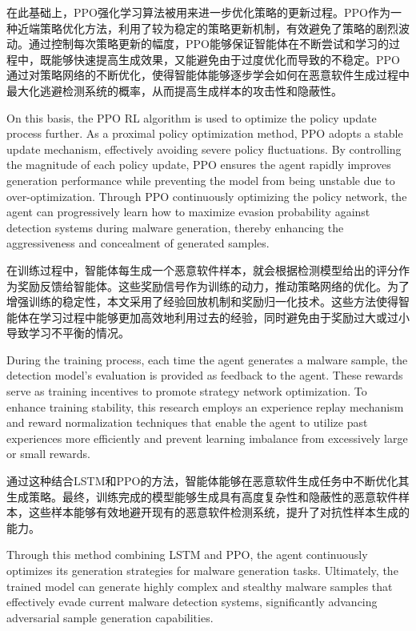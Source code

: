 在此基础上，PPO强化学习算法被用来进一步优化策略的更新过程。PPO作为一种近端策略优化方法，利用了较为稳定的策略更新机制，有效避免了策略的剧烈波动。通过控制每次策略更新的幅度，PPO能够保证智能体在不断尝试和学习的过程中，既能够快速提高生成效果，又能避免由于过度优化而导致的不稳定。PPO通过对策略网络的不断优化，使得智能体能够逐步学会如何在恶意软件生成过程中最大化逃避检测系统的概率，从而提高生成样本的攻击性和隐蔽性。

On this basis, the PPO RL algorithm is used to optimize the policy update process further. As a proximal policy optimization method, PPO adopts a stable update mechanism, effectively avoiding severe policy fluctuations. By controlling the magnitude of each policy update, PPO ensures the agent rapidly improves generation performance while preventing the model from being unstable due to over-optimization. Through PPO continuously optimizing the policy network, the agent can progressively learn how to maximize evasion probability against detection systems during malware generation, thereby enhancing the aggressiveness and concealment of generated samples.

在训练过程中，智能体每生成一个恶意软件样本，就会根据检测模型给出的评分作为奖励反馈给智能体。这些奖励信号作为训练的动力，推动策略网络的优化。为了增强训练的稳定性，本文采用了经验回放机制和奖励归一化技术。这些方法使得智能体在学习过程中能够更加高效地利用过去的经验，同时避免由于奖励过大或过小导致学习不平衡的情况。

During the training process, each time the agent generates a malware sample, the detection model's evaluation is provided as feedback to the agent. These rewards serve as training incentives to promote strategy network optimization. To enhance training stability, this research employs an experience replay mechanism and reward normalization techniques that enable the agent to utilize past experiences more efficiently and prevent learning imbalance from excessively large or small rewards.

通过这种结合LSTM和PPO的方法，智能体能够在恶意软件生成任务中不断优化其生成策略。最终，训练完成的模型能够生成具有高度复杂性和隐蔽性的恶意软件样本，这些样本能够有效地避开现有的恶意软件检测系统，提升了对抗性样本生成的能力。

Through this method combining LSTM and PPO, the agent continuously optimizes its generation strategies for malware generation tasks. Ultimately, the trained model can generate highly complex and stealthy malware samples that effectively evade current malware detection systems, significantly advancing adversarial sample generation capabilities.

